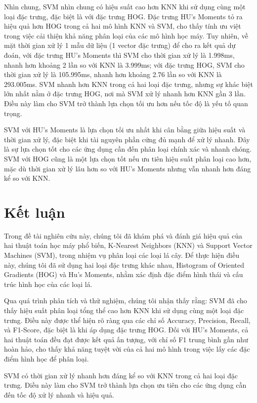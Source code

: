 \documentclass[a4paper]{article}
\begin{document}
Nhìn chung, SVM nhìn chung có hiệu suất cao hơn KNN khi sử dụng cùng một loại đặc trưng, đặc biệt là với đặc trưng HOG. Đặc trưng HU's Moments tỏ ra hiệu quả hơn HOG trong cả hai mô hình KNN và SVM, cho thấy tính ưu việt trong việc cải thiện khả năng phân loại của các mô hình học máy. Tuy nhiên, về mặt thời gian xử lý 1 mẫu dữ liệu (1 vector đặc trưng) để cho ra kết quả dự đoán, với đặc trưng HU's Moments thì SVM cho thời gian xử lý là 1.998ms, nhanh hơn khoảng 2 lần so với KNN là 3.999ms; với đặc trưng HOG, SVM cho thời gian xử lý là 105.995ms, nhanh hơn khoảng 2.76 lần so với KNN là 293.005ms. SVM nhanh hơn KNN trong cả hai loại đặc trưng, nhưng sự khác biệt lớn nhất nằm ở đặc trưng HOG, nơi mà SVM xử lý nhanh hơn KNN gần 3 lần. Điều này làm cho SVM trở thành lựa chọn tối ưu hơn nếu tốc độ là yếu tố quan trọng.

SVM với HU's Moments là lựa chọn tối ưu nhất khi cân bằng giữa hiệu suất và thời gian xử lý, đặc biệt khi tài nguyên phần cứng đủ mạnh để xử lý nhanh. Đây là sự lựa chọn tốt cho các ứng dụng cần đến phân loại chính xác và nhanh chóng. SVM với HOG cũng là một lựa chọn tốt nếu ưu tiên hiệu suất phân loại cao hơn, mặc dù thời gian xử lý lâu hơn so với HU's Moments nhưng vẫn nhanh hơn đáng kể so với KNN.

\section{Kết luận}
Trong đề tài nghiên cứu này, chúng tôi đã khám phá và đánh giá hiệu quả của hai thuật toán học máy phổ biến, K-Nearest Neighbors (KNN) và Support Vector Machines (SVM), trong nhiệm vụ phân loại các loại lá cây. Để thực hiện điều này, chúng tôi đã sử dụng hai loại đặc trưng khác nhau, Histogram of Oriented Gradients (HOG) và Hu's Moments, nhằm xác định đặc điểm hình thái và cấu trúc hình học của các loại lá.

Qua quá trình phân tích và thử nghiệm, chúng tôi nhận thấy rằng: SVM đã cho thấy hiệu suất phân loại tổng thể cao hơn KNN khi sử dụng cùng một loại đặc trưng. Điều này được thể hiện rõ ràng qua các chỉ số Accuracy, Precision, Recall, và F1-Score, đặc biệt là khi áp dụng đặc trưng HOG. Đối với HU's Moments, cả hai thuật toán đều đạt được kết quả ấn tượng, với chỉ số F1 trung bình gần như hoàn hảo, cho thấy khả năng tuyệt vời của cả hai mô hình trong việc lấy các đặc điểm hình học để phân loại.

SVM có thời gian xử lý nhanh hơn đáng kể so với KNN trong cả hai loại đặc trưng. Điều này làm cho SVM trở thành lựa chọn ưu tiên cho các ứng dụng cần đến tốc độ xử lý nhanh và hiệu quả.
\end{document}
